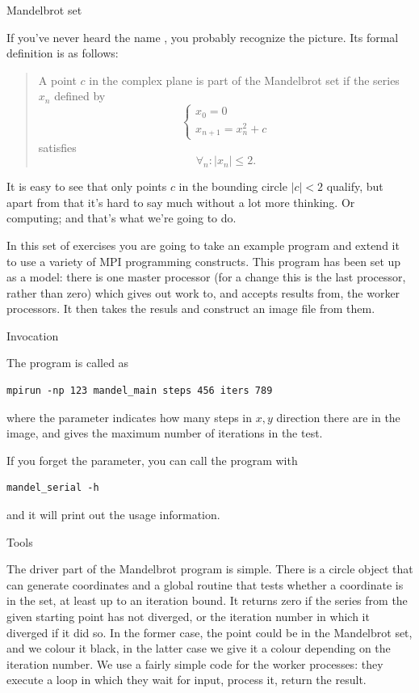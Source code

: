  {Mandelbrot set}

If you've never heard the name , you
probably recognize the picture. Its formal definition is as follows:
\begin{quotation}\noindent
  A point $c$ in the complex plane is part of the Mandelbrot set if 
  the series $x_n$ defined by 
  \[ 
  \begin{cases}
    x_0=0\\ x_{n+1}=x_n^2+c
  \end{cases}
  \] satisfies \[ \forall_n\colon |x_n|\leq 2. \]  
\end{quotation}
It is easy to see that only points $c$ in the bounding circle
$|c|< 2$ qualify, but
apart from that it's hard to say much without a lot more thinking.
Or computing; and that's what we're going to do.

In this set of exercises you are going to take an example program
 and extend it to use a variety of MPI programming
constructs.  This program has been set up as a
 model: there is one master processor (for a
change this is the last processor, rather than zero) which gives out
work to, and accepts results from, the worker processors. It then
takes the resuls and construct an image file from them.

 {Invocation}

The  program is called as
\begin{verbatim}
mpirun -np 123 mandel_main steps 456 iters 789
\end{verbatim}
where the  parameter indicates how many steps in $x,y$
direction there are in the image, and  gives the maximum
number of iterations in the  test.

If you forget the parameter, you can call the program with
\begin{verbatim}
mandel_serial -h
\end{verbatim}
and it will print out the usage information.

 {Tools}

The driver part of the Mandelbrot program is simple. There is a 
circle object that can generate coordinates
and a global routine that tests whether a coordinate is in the set,
at least up to an iteration bound. It returns zero if the 
series from the given starting point has not diverged,
or the iteration number in which it diverged if it did so.
In the former case,  the point could be in the Mandelbrot set, 
and we colour it black, in the latter case we give it a colour
depending on the iteration number.
We use a fairly simple code for the worker processes: they 
execute a loop in which they wait 
for input, process it, return the result.

